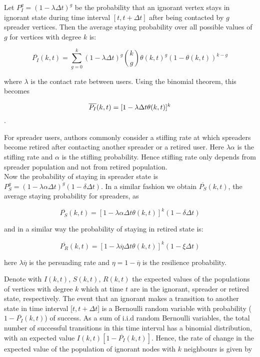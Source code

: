 Let $P^g_{I}=(1-\lambda\Delta t)^g$ be the probability that an ignorant vertex stays in ignorant state during time interval $[t,t+\Delta t]$ after being contacted by $g$ spreader vertices. Then the average staying probability over all possible values of $g$ for vertices with degree $k$ is:

\begin{equation}
\label{eq:PII}
\overline{P_{I}}(k,t)=\sum_{g=0}^k(1-\lambda\Delta t)^g\binom{k}{g}\theta(k,t)^g(1-\theta(k,t))^{k-g}
\end{equation}

where $\lambda$ is the contact rate between users. Using the binomial theorem, this becomes

\begin{equation}
\overline{P_{I}}(k,t)=[1-\lambda\Delta t\theta(k,t)]^k\\
\end{equation}.

For spreader users, authors commonly consider a stifling rate at which spreaders become retired after contacting another spreader or a retired user. Here $\lambda\alpha$ is the stifling rate and $\alpha$ is the stifling probability. Hence stifling rate only depends from spreader population and not from retired population.
\\
Now the probability of staying in spreader state is $P^g_{S}=(1-\lambda\alpha\Delta t)^g(1-\delta\Delta t)$. In a similar fashion we obtain $\overline{P_{S}}(k,t)$, the average staying probability for spreaders, as

\begin{equation}
\label{eq:PS}
\overline{P_{S}}(k,t)=[1-\lambda\alpha\Delta t \theta(k,t)]^k(1-\delta\Delta t)
\end{equation}

and in a similar way the probability of staying in retired state is:

\begin{equation}
\label{eq:PR}
\overline{P_{R}}(k,t)=[1-\lambda\overline{\eta}\Delta t \theta(k,t)]^k(1-\xi\Delta t)
\end{equation}

here $\lambda\overline{\eta}$ is the persuading rate and $\eta=1-\overline{\eta}$ is the resilience probability.

Denote with $I(k,t)$, $S(k,t)$, $R(k,t)$ the expected values of the populations of vertices with degree $k$ which at time $t$ are in the ignorant, spreader or retired state, respectively. The event that an ignorant makes a transition to another state in time interval [$t,t+\Delta t$] is a Bernoulli random variable with probability ($1-\overline{P_{I}}(k,t)$) of success. As a sum of i.i.d random Bernoulli variables, the total number of successful transitions in this time interval has a binomial distribution, with an expected value $I(k,t)[1-\overline{P_{I}}(k,t)]$. Hence, the rate of change in the expected value of the population of ignorant nodes with $k$ neighbours is given by

